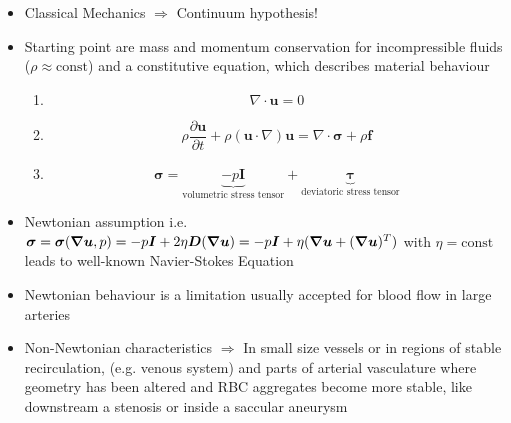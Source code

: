 \documentclass{beamer}
\begin{document}
	
	    \begin{frame}
	    \begin{itemize}
	        \item        Classical Mechanics
			    $\Rightarrow$ Continuum hypothesis!
			    \item Starting point are mass and momentum conservation for incompressible fluids ($\rho \approx \text{const}$) and a constitutive equation, which describes material behaviour 
	    \begin{enumerate}
			    \item \begin{equation*}
			         \nabla \cdot \bm{u} = 0
			    \end{equation*}
			      \item \begin{equation*}
			         \rho  \frac{\partial \bm{u}}{\partial t} + \rho (\bm{u} \cdot \nabla) \bm{u} =  \nabla \cdot \bm{\sigma} + \rho\bm{f}
			    \end{equation*}
			    \item \begin{equation*}\bm{\sigma} = \underbrace{-p\bm{I} }_{\text{volumetric stress tensor}} + \underbrace{\bm{\tau}   }_{\text{deviatoric stress tensor}} \end{equation*}
			    \end{enumerate}	
			 
			    \item Newtonian assumption i.e. $
    \bm{\sigma} = \bm{\sigma}(\grad\bm{u},p)= -p\bm{I} +2\eta\bm{D}(\grad\bm{u})= -p\bm{I} + \eta(\grad\bm{u}+(\grad\bm{u})^T)$
    with $\eta = \text{const}$ leads to well-known Navier-Stokes Equation
	    \end{itemize}
		    \end{frame}

	
	    \begin{frame}
	    \begin{itemize}
        \item Newtonian behaviour is a limitation usually accepted for blood flow in large arteries
        \item Non-Newtonian
characteristics $\Rightarrow$ In small size vessels or in regions of stable recirculation, (e.g. venous system) and parts of  arterial vasculature where geometry has been altered and RBC aggregates become more stable,
like downstream a stenosis or inside a saccular aneurysm
	    \end{itemize}
		    \end{frame}
	
\end{document}
